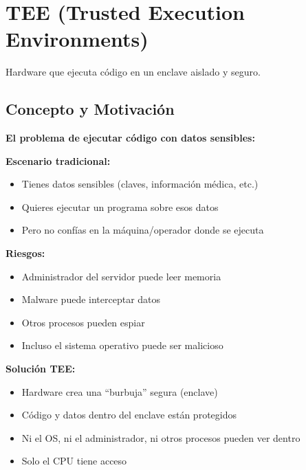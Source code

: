 \documentclass[11pt,a4paper,twoside]{book}
\begin{document}
\section{TEE (Trusted Execution Environments)}
\label{sec:tee}

\begin{definition}[TEE]
Hardware que ejecuta c\'odigo en un enclave aislado y seguro.
\end{definition}

\subsection{Concepto y Motivaci\'on}

\begin{intuicion}
\textbf{El problema de ejecutar c\'odigo con datos sensibles:}

\textbf{Escenario tradicional:}
\begin{itemize}
    \item Tienes datos sensibles (claves, informaci\'on m\'edica, etc.)
    \item Quieres ejecutar un programa sobre esos datos
    \item Pero no conf\'ias en la m\'aquina/operador donde se ejecuta
\end{itemize}

\textbf{Riesgos:}
\begin{itemize}
    \item Administrador del servidor puede leer memoria
    \item Malware puede interceptar datos
    \item Otros procesos pueden espiar
    \item Incluso el sistema operativo puede ser malicioso
\end{itemize}

\textbf{Soluci\'on TEE:}
\begin{itemize}
    \item Hardware crea una ``burbuja'' segura (enclave)
    \item C\'odigo y datos dentro del enclave est\'an protegidos
    \item Ni el OS, ni el administrador, ni otros procesos pueden ver dentro
    \item Solo el CPU tiene acceso
\end{itemize}
\end{intuicion}
\end{document}
